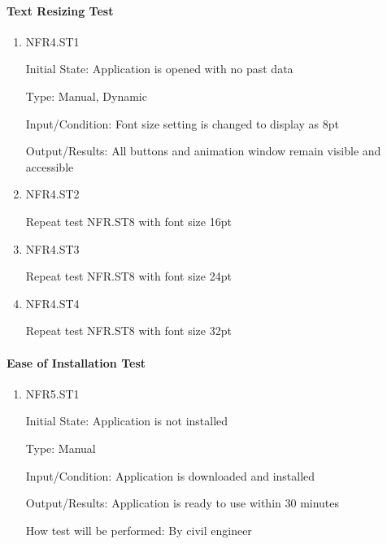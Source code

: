 \documentclass[12pt, titlepage]{article}
\begin{document}
\paragraph{Text Resizing Test}

\begin{enumerate}

\item{NFR4.ST1\\}

Initial State: Application is opened with no past data

Type: Manual, Dynamic

Input/Condition: Font size setting is changed to display as 8pt

Output/Results: All buttons and animation window remain visible and accessible

\item{NFR4.ST2\\}

Repeat test NFR.ST8 with font size 16pt

\item{NFR4.ST3\\}

Repeat test NFR.ST8 with font size 24pt

\item{NFR4.ST4\\}

Repeat test NFR.ST8 with font size 32pt

\end{enumerate}

\paragraph{Ease of Installation Test}

\begin{enumerate}

\item{NFR5.ST1\\}

Initial State: Application is not installed

Type: Manual

Input/Condition: Application is downloaded and installed

Output/Results: Application is ready to use within 30 minutes

How test will be performed: By civil engineer

\end{enumerate}
\end{document}
